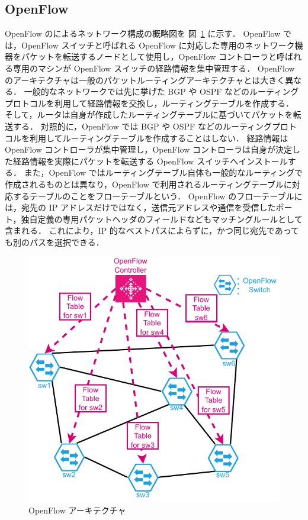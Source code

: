 \subsection{OpenFlow}
\label{sbsection:openflow}
OpenFlow のによるネットワーク構成の概略図を 図~\ref{fig:openflow} に示す．
OpenFlow では，OpenFlow スイッチと呼ばれる OpenFlow に対応した専用のネットワーク機器をパケットを転送するノードとして使用し，OpenFlow コントローラと呼ばれる専用のマシンが OpenFlow スイッチの経路情報を集中管理する．
OpenFlow のアーキテクチャは一般のパケットルーティングアーキテクチャとは大きく異なる．
一般的なネットワークでは先に挙げた BGP や OSPF などのルーティングプロトコルを利用して経路情報を交換し，ルーティングテーブルを作成する．
そして，ルータは自身が作成したルーティングテーブルに基づいてパケットを転送する．
対照的に，OpenFlow では BGP や OSPF などのルーティングプロトコルを利用してルーティングテーブルを作成することはしない．
経路情報は OpenFlow コントローラが集中管理し，OpenFlow コントローラは自身が決定した経路情報を実際にパケットを転送する OpenFlow スイッチへインストールする．
また，OpenFlow ではルーティングテーブル自体も一般的なルーティングで作成されるものとは異なり，OpenFlow で利用されるルーティングテーブルに対応するテーブルのことをフローテーブルという．
OpenFlow のフローテーブルには，宛先の IP アドレスだけではなく，送信元アドレスや通信を受信したポート，独自定義の専用パケットヘッダのフィールドなどもマッチングルールとして含まれる．
これにより，IP 的なベストパスによらずに，かつ同じ宛先であっても別のパスを選択できる．

\begin{figure}[t]
    \centering
    \includegraphics[width=0.95\linewidth]{img/OpenFlow.pdf}
    \caption{OpenFlow アーキテクチャ}
    \label{fig:openflow}
\end{figure}

